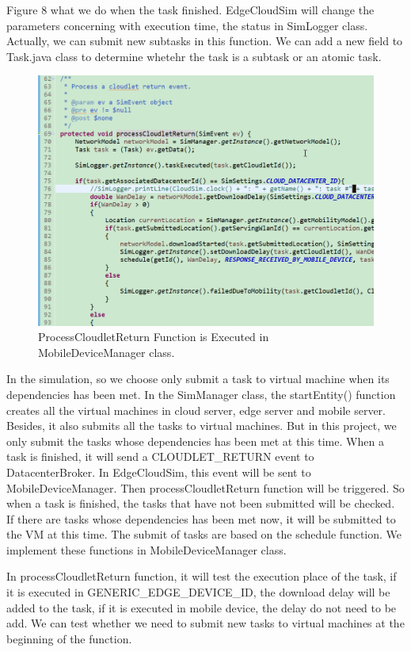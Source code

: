 Figure 8 what we do when the task finished. EdgeCloudSim will change the parameters concerning with execution time, the status in SimLogger class. Actually, we can submit new subtasks in this function. We can add a new field to Task.java class to determine whetehr the task is a subtask or an atomic task.
\begin{figure}
	\centering
	\includegraphics[width=1\textwidth]{./figures/processCloudletReturn.png}
	\caption{\label{fig:frog}ProcessCloudletReturn Function is Executed in MobileDeviceManager class.}
\end{figure}

 In the simulation, so we choose only submit a task to virtual machine when its dependencies has been met. In the SimManager class, the startEntity() function creates all the virtual machines in cloud server, edge server and mobile server. Besides, it also submits all the tasks to virtual machines. But in this project, we only submit the tasks whose dependencies has been met at this time. When a task is finished, it will send a CLOUDLET\_RETURN event to DatacenterBroker. In EdgeCloudSim, this event will be sent to MobileDeviceManager. Then processCloudletReturn function will be triggered. So when a task is finished, the tasks that have not been submitted will be checked. If there are tasks whose dependencies has been met now, it will be submitted to the VM at this time. The submit of tasks are based on the schedule function. We implement these functions in MobileDeviceManager class.

In processCloudletReturn function, it will test the execution place of the task, if it is executed in GENERIC\_EDGE\_DEVICE\_ID, the download delay will be added to the task, if it is executed in mobile device, the delay do not need to be add. We can test whether we need to submit new tasks to virtual machines at the  beginning of the function. 

